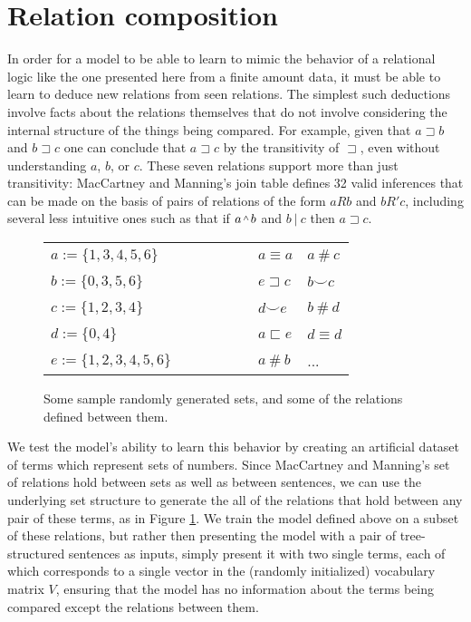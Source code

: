 \section{Relation composition}

In order for a model to be able to learn to mimic the behavior of a relational logic like the one presented here from a finite amount data, it must be able to learn to deduce new relations from seen relations. The simplest such deductions involve facts about the relations themselves that do not involve considering the internal structure of the things being compared. For example, given that $a\sqsupset b$ and $b\sqsupset c$ one can conclude that $a\sqsupset c$ by the transitivity of $\sqsupset$, even without understanding $a$, $b$, or $c$. These seven relations support more than just transitivity: MacCartney and Manning's \cite{maccartney2009extended} join table defines 32 valid inferences that can be made on the basis of pairs of relations of the form $a R b$ and $b R' c$, including several less intuitive ones such as that if $a \natneg b$ and $b~|~c$ then $a \sqsupset c$. 

\begin{figure}[t]
\begin{center}
\begin{tabular}{ll|lll}
$a := \{1, 3, 4, 5, 6\}	$&~~~&~~~& $a \equiv a$	    	& $a~\#~c$	\\
$b := \{0, 3, 5, 6\}	$&~~~&~~~& $e \sqsupset c$	&$b \smallsmile c$		\\
$c := \{1, 2, 3, 4\}	$&~~~&~~~& $d \smallsmile e$	& $b~\#~d$		\\
$d := \{0, 4\}		$&~~~&~~~& $a \sqsubset e$	& $ d \equiv d$	\\
$e := \{1, 2, 3, 4, 5, 6\}$&~~~&~~~& $a~\#~b$		& ... 	\\
\end{tabular}
\end{center}

\caption{Some sample randomly generated sets, and some of the relations defined between them.  \label{lattice-figure}} 
\end{figure}

We test the model's ability to learn this behavior by creating an artificial dataset of terms which represent sets of numbers. Since MacCartney and Manning's set of relations hold between sets as well as between sentences, we can use the underlying set structure to generate the all of the relations that hold between any pair of these terms, as in Figure \ref{lattice-figure}. We train the model defined above on a subset of these relations, but rather then presenting the model with a pair of tree-structured sentences as inputs, simply present it with two single terms, each of which corresponds to a single vector in the (randomly initialized) vocabulary matrix $V$, ensuring that the model has no information about the terms being compared except the relations between them.

